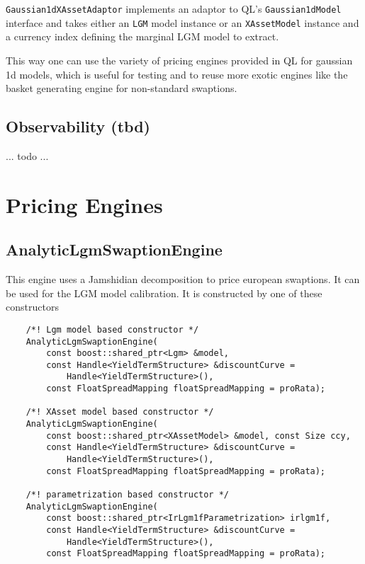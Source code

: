 \documentclass[12pt, a4paper]{article}
\begin{document}
\verb+Gaussian1dXAssetAdaptor+ implements an adaptor to QL's \verb+Gaussian1dModel+ interface and takes either an \verb+LGM+ model instance or an \verb+XAssetModel+ instance and a currency index defining the marginal LGM model to extract.

This way one can use the variety of pricing engines provided in QL for gaussian 1d models, which is useful for testing and to reuse more exotic engines like the basket generating engine for non-standard swaptions.

\subsection{Observability (tbd)}

... todo ...

\section{Pricing Engines}

\subsection{AnalyticLgmSwaptionEngine}

This engine uses a Jamshidian decomposition to price european swaptions. It can be used for the LGM model calibration. It is constructed by one of these constructors

\medskip
\scriptsize
\begin{verbatim}
    /*! Lgm model based constructor */
    AnalyticLgmSwaptionEngine(
        const boost::shared_ptr<Lgm> &model,
        const Handle<YieldTermStructure> &discountCurve =
            Handle<YieldTermStructure>(),
        const FloatSpreadMapping floatSpreadMapping = proRata);

    /*! XAsset model based constructor */
    AnalyticLgmSwaptionEngine(
        const boost::shared_ptr<XAssetModel> &model, const Size ccy,
        const Handle<YieldTermStructure> &discountCurve =
            Handle<YieldTermStructure>(),
        const FloatSpreadMapping floatSpreadMapping = proRata);

    /*! parametrization based constructor */
    AnalyticLgmSwaptionEngine(
        const boost::shared_ptr<IrLgm1fParametrization> irlgm1f,
        const Handle<YieldTermStructure> &discountCurve =
            Handle<YieldTermStructure>(),
        const FloatSpreadMapping floatSpreadMapping = proRata);
\end{verbatim}
\normalsize
\medskip
\end{document}
